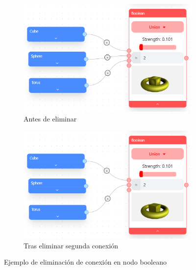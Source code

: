\begin{figure}[!h]
    \centering
    \begin{subfigure}[b]{0.45\textwidth}
        \centering
        \includegraphics[width=\textwidth]{Plantilla-TFG-master/img/booleanBorrar1.png}
        \caption{Antes de eliminar}
    \end{subfigure}
    \hspace{15pt}
    \begin{subfigure}[b]{0.45\textwidth}
        \centering
        \includegraphics[width=\textwidth]{Plantilla-TFG-master/img/booleanBorrar2.png}
        \caption{Tras eliminar segunda conexión}
    \end{subfigure}
    \hfill
     \caption{Ejemplo de eliminación de conexión en nodo booleano}
\end{figure}

